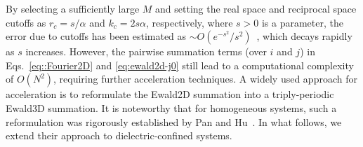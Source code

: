 By selecting a sufficiently large $M$ and setting the real space and reciprocal space cutoffs as $r_c=s/\alpha$ and $k_c=2s\alpha$, respectively, where $s>0$ is a parameter, 
the error due to cutoffs has been estimated as $\sim O(e^{-s^2}/s^2)$~\cite{gan2024fast}, which decays rapidly as $s$ increases. 
However, the pairwise summation terms (over $i$ and $j$) in Eqs.~\eqref{eq::Fourier2D} and \eqref{eq:ewald2d-j0} still lead to a computational complexity of $O(N^2)$, requiring further acceleration techniques.
A widely used approach for acceleration is to reformulate the Ewald2D summation into a triply-periodic Ewald3D summation.
It is noteworthy that for homogeneous systems, such a reformulation was rigorously established by Pan and Hu~\cite{pan2014rigorous}. 
In what follows, we extend their approach to dielectric-confined systems.


